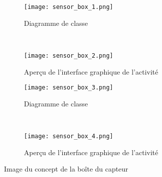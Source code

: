 \begin{figure}[htb!]
    \centering
    \begin{subfigure}[htb]{0.49\textwidth}
		\texttt{[image: sensor\_box\_1.png]} 
		\caption{Diagramme de classe}
		\label{fig:sensor_box_1}
    \end{subfigure}
    ~ %
    \begin{subfigure}[htb]{0.49\textwidth}
		\texttt{[image: sensor\_box\_2.png]} 
		\caption{Aperçu de l'interface graphique de l'activité}
		\label{fig:sensor_box_2}
    \end{subfigure}
    \begin{subfigure}[htb]{0.49\textwidth}
		\texttt{[image: sensor\_box\_3.png]} 
		\caption{Diagramme de classe}
		\label{fig:sensor_box_3}
    \end{subfigure}
    ~ %
    \begin{subfigure}[htb]{0.49\textwidth}
		\texttt{[image: sensor\_box\_4.png]} 
		\caption{Aperçu de l'interface graphique de l'activité}
		\label{fig:sensor_box_4}
    \end{subfigure}    
    \caption{Image du concept de la boîte du capteur}\label{fig:sensor_box}
\end{figure}

